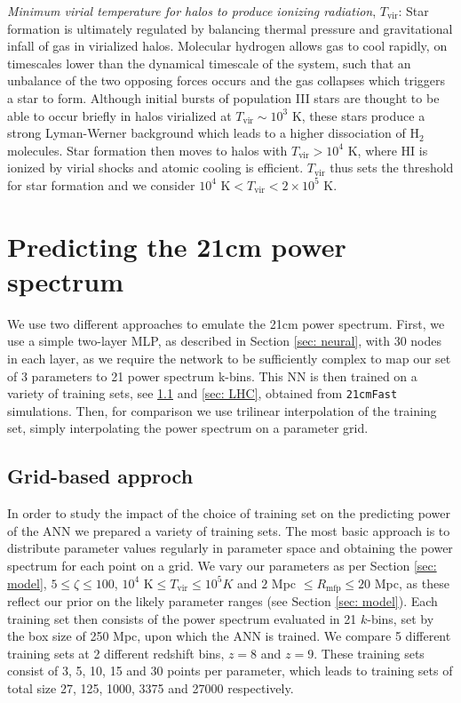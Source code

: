 \documentclass[useAMS,usenatbib]{mnras}
\begin{document}
\textit{Minimum virial temperature for halos to produce ionizing radiation}, $T_\text{vir}$:
Star formation is ultimately regulated by balancing thermal pressure and gravitational infall of gas in virialized halos. 
Molecular hydrogen allows gas to cool rapidly, on timescales lower than the dynamical timescale of the system, such that an unbalance of the two opposing forces occurs and the gas collapses which triggers a star to form. 
Although initial bursts of population III stars are thought to be able to occur briefly in halos virialized at $T_\text{vir} \sim 10^3\text{ K}$, these stars produce a strong Lyman-Werner background which leads to a higher dissociation of H$_2$ molecules. 
Star formation then moves to halos with $T_\text{vir} > 10^4\text{ K}$, where HI is ionized by virial shocks and atomic cooling is efficient.
$T_\text{vir}$ thus sets the threshold for star formation and we consider $10^4\text{ K} < T_\text{vir} < 2\times10^5\text{ K}$.
\section{Predicting the 21cm power spectrum} 
\label{sec: power}


We use two different approaches to emulate the 21cm power spectrum. 
First, we use a simple two-layer MLP, as described in Section \ref{sec: neural}, with 30 nodes in each layer, as we require the network to be sufficiently complex to map our set of 3 parameters to 21 power spectrum k-bins. 
This NN is then trained on a variety of training sets, see \ref{sec: grid training} and \ref{sec: LHC}, obtained from \texttt{21cmFast} simulations. 
Then, for comparison we use trilinear interpolation of the training set, simply interpolating the power spectrum on a parameter grid.

\subsection{Grid-based approch}\label{sec: grid training}
In order to study the impact of the choice of training set on the predicting power of the ANN we prepared a variety of training sets. 
The most basic approach is to distribute parameter values regularly in parameter space and obtaining the power spectrum for each point on a grid. 
We vary our parameters as per Section \ref{sec: model}, $5 \leq \zeta \leq 100 $, $10^4\text{ K} \leq T_\text{vir} \leq 10^5 K$ and $2$ Mpc $\leq R_\text{mfp} \leq 20$ Mpc, as these reflect our prior on the likely parameter ranges (see Section \ref{sec: model}).
Each training set then consists of the power spectrum evaluated in 21 $k$-bins, set by the box size of 250 Mpc, upon which the ANN is trained. 
We compare 5 different training sets at 2 different redshift bins, $z = 8$ and $z = 9$. 
These training sets consist of 3, 5, 10, 15 and 30 points per parameter, which leads to training sets of total size 27, 125, 1000, 3375 and 27000 respectively.
\end{document}
